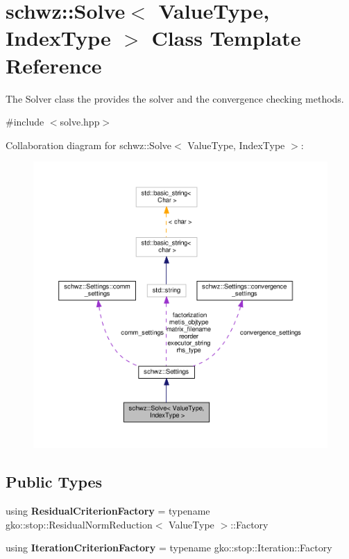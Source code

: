 \hypertarget{classschwz_1_1Solve}{}\section{schwz\+:\+:Solve$<$ Value\+Type, Index\+Type $>$ Class Template Reference}
\label{classschwz_1_1Solve}


The Solver class the provides the solver and the convergence checking methods.  




{\ttfamily \#include $<$solve.\+hpp$>$}



Collaboration diagram for schwz\+:\+:Solve$<$ Value\+Type, Index\+Type $>$\+:
\nopagebreak
\begin{figure}[H]
\begin{center}
\leavevmode
\includegraphics[width=350pt]{classschwz_1_1Solve__coll__graph}
\end{center}
\end{figure}
\subsection*{Public Types}
\begin{DoxyCompactItemize}
\item 
\mbox{\label{classschwz_1_1Solve_a6a041c5fd6d3439b0203cf6844c0a984}} 
using {\bfseries Residual\+Criterion\+Factory} = typename gko\+::stop\+::\+Residual\+Norm\+Reduction$<$ Value\+Type $>$\+::Factory
\item 
\mbox{\label{classschwz_1_1Solve_ad7301198e28c66c6f94d7d717e07d420}} 
using {\bfseries Iteration\+Criterion\+Factory} = typename gko\+::stop\+::\+Iteration\+::\+Factory
\end{DoxyCompactItemize}
